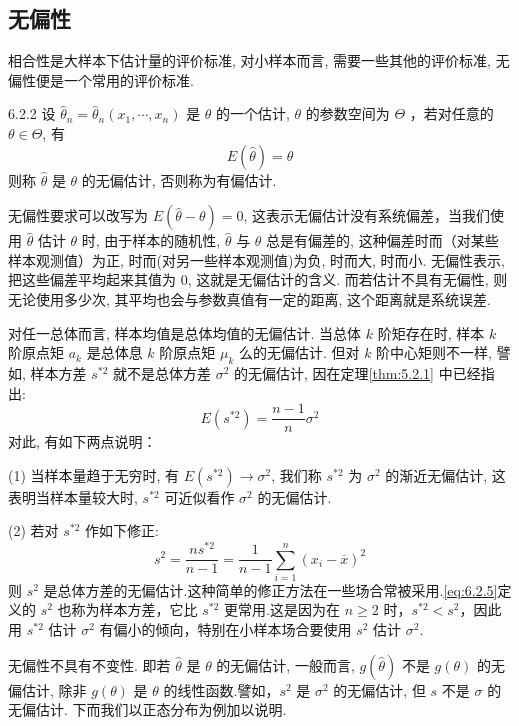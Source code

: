 \subsection{无偏性}\label{ssec:6.2.2} %

相合性是大样本下估计量的评价标准, 对小样本而言, 需要一些其他的评价标准, 无偏性便是一个常用的评价标准.

\begin{definition}{}{6.2.2} %
设 $\hat{\theta}_n=\hat{\theta}_n(x_1,\cdots,x_n)$ 是 $\theta$ 的一个估计, $\theta$ 的参数空间为 $\Theta$ ，若对任意的 $\theta\in\Theta$, 有
\begin{equation}\label{eq:6.2.4}
E(\hat{\theta})=\theta
\end{equation}
则称 $\hat\theta$ 是 $\theta$ 的{\heiti 无偏估计}, 否则称为{\heiti 有偏估计}.
\end{definition}

无偏性要求可以改写为 $E(\hat{\theta}-\theta)=0$, 这表示无偏估计没有系统偏差，当我们使用 $\hat{\theta}$ 估计 $\theta$ 时, 由于样本的随机性, $\hat{\theta}$ 与 $\theta$ 总是有偏差的, 这种偏差时而（对某些样本观测值）为正, 时而(对另一些样本观测值)为负, 时而大, 时而小. 无偏性表示, 把这些偏差平均起来其值为 0, 这就是无偏估计的含义. 而若估计不具有无偏性, 则无论使用多少次, 其平均也会与参数真值有一定的距离, 这个距离就是系统误差.

\begin{example}\label{exam:6.2.4}
对任一总体而言, 样本均值是总体均值的无偏估计. 当总体 $k$ 阶矩存在时, 样本 $k$ 阶原点矩 $a_k$ 是总体息 $k$ 阶原点矩 $\mu_k$ 么的无偏估计. 但对 $k$ 阶中心矩则不一样, 譬如, 样本方差 $s^{*2}$ 就不是总体方差 $\sigma^2$ 的无偏估计, 因在定理\ref{thm:5.2.1}
中已经指出:
\[E\left(s^{* 2}\right)=\frac{n-1}{n} \sigma^{2}\]
对此, 有如下两点说明：

(1) 当样本量趋于无穷时, 有 $E(s^{*2})\to\sigma^2$, 我们称 $s^{*2}$ 为 $\sigma^2$ 的渐近无偏估计, 这表明当样本量较大时,  $s^{*2}$ 可近似看作 $\sigma^2$ 的无偏估计.

(2) 若对 $s^{*2}$ 作如下修正:
\begin{equation}\label{eq:6.2.5}
s^{2}=\frac{n s^{* 2}}{n-1}=\frac{1}{n-1} \sum_{i=1}^{n}\left(x_{i}-\overline{x}\right)^{2}
\end{equation}
则 $s^2$ 是总体方差的无偏估计.这种简单的修正方法在一些场合常被采用.\eqref{eq:6.2.5}定义的 $s^2$ 也称为样本方差，它比 $s^{*2}$ 更常用.这是因为在 $n\geqslant2$ 时，$s^{*2}<s^2$，因此用 $s^{*2}$ 估计 $\sigma^2$ 有偏小的倾向，特别在小样本场合要使用 $s^2$ 估计 $\sigma^2$.

无偏性不具有不变性. 即若 $\hat{\theta}$ 是 $\theta$ 的无偏估计, 一般而言, $g(\hat{\theta})$ 不是 $g(\theta)$ 的无偏估计, 除非 $g(\theta)$ 是 $\theta$ 的线性函数.譬如，$s^2$ 是 $\sigma^2$ 的无偏估计, 但 $s$ 不是 $\sigma$ 的无偏估计. 下而我们以正态分布为例加以说明.
\end{example}

